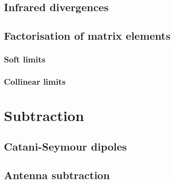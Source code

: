 \documentclass[main.tex]{subfiles}
\begin{document}
\subsection{Infrared divergences}
\subsection{Factorisation of matrix elements}
\subsubsection{Soft limits}
\subsubsection{Collinear limits}

\section{Subtraction}
\subsection{Catani-Seymour dipoles}
\subsection{Antenna subtraction}
\end{document}
